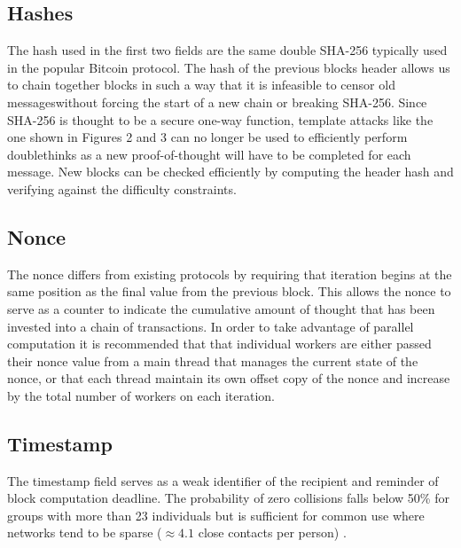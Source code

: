 \documentclass[
parskip=half
]{article}
\begin{document}
\subsection{Hashes}
The hash used in the first two fields are the same double SHA-256 typically used in the popular Bitcoin protocol. The hash of the previous blocks header allows us to chain together blocks in such a way that it is infeasible to censor old messages\footnotemark without forcing the start of a new chain or breaking SHA-256. Since SHA-256 is thought to be a secure one-way function, template attacks like the one shown in Figures 2 and 3 can no longer be used to efficiently perform doublethinks as a new proof-of-thought will have to be completed for each message. New blocks can be checked efficiently by computing the header hash and verifying against the difficulty constraints.

\subsection{Nonce}
The nonce differs from existing protocols by requiring that iteration begins at the same position as the final value from the previous block. This allows the nonce to serve as a counter to indicate the cumulative amount of thought that has been invested into a chain of transactions. In order to take advantage of parallel computation it is recommended that that individual workers are either passed their nonce value from a main thread that manages the current state of the nonce, or that each thread maintain its own offset copy of the nonce and increase by the total number of workers on each iteration.


\subsection{Timestamp}
The timestamp field serves as a weak identifier of the recipient and reminder of block computation deadline. The probability of zero collisions falls below 50\% for groups with more than 23 individuals\cite{wagner2002generalized} but is sufficient for common use where networks tend to be sparse ($\approx4.1$ close contacts per person) \cite{mac2016calling}.
\end{document}
